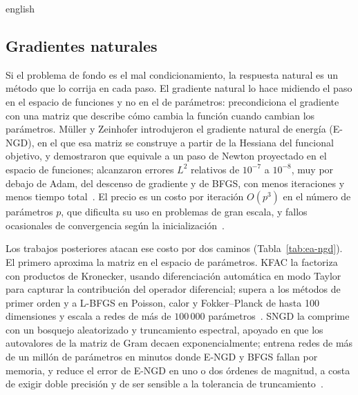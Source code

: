 \documentclass[0000.tex]{subfiles}
\begin{document}
\begin{hyphenrules}{english}
\subsection{Gradientes naturales}
\label{subsec:ea-ngd}

Si el problema de fondo es el mal condicionamiento, la respuesta natural es un método que lo corrija en cada paso. El gradiente natural lo hace midiendo el paso en el espacio de funciones y no en el de parámetros: precondiciona el gradiente con una matriz que describe cómo cambia la función cuando cambian los parámetros. Müller y Zeinhofer introdujeron el gradiente natural de energía (E-NGD), en el que esa matriz se construye a partir de la Hessiana del funcional objetivo, y demostraron que equivale a un paso de Newton proyectado en el espacio de funciones; alcanzaron errores $L^2$ relativos de $10^{-7}$ a $10^{-8}$, muy por debajo de Adam, del descenso de gradiente y de BFGS, con menos iteraciones y menos tiempo total~\cite{muller2023achieving}. El precio es un costo por iteración $O(p^3)$ en el número de parámetros $p$, que dificulta su uso en problemas de gran escala, y fallos ocasionales de convergencia según la inicialización~\cite{muller2023achieving}.

Los trabajos posteriores atacan ese costo por dos caminos (Tabla~\ref{tab:ea-ngd}). El primero aproxima la matriz en el espacio de parámetros. KFAC la factoriza con productos de Kronecker, usando diferenciación automática en modo Taylor para capturar la contribución del operador diferencial; supera a los métodos de primer orden y a L-BFGS en Poisson, calor y Fokker--Planck de hasta 100 dimensiones y escala a redes de más de $100\,000$ parámetros~\cite{dangel2024kronecker}. SNGD la comprime con un bosquejo aleatorizado y truncamiento espectral, apoyado en que los autovalores de la matriz de Gram decaen exponencialmente; entrena redes de más de un millón de parámetros en minutos donde E-NGD y BFGS fallan por memoria, y reduce el error de E-NGD en uno o dos órdenes de magnitud, a costa de exigir doble precisión y de ser sensible a la tolerancia de truncamiento~\cite{mckay2025near}.


\end{hyphenrules}
\end{document}
